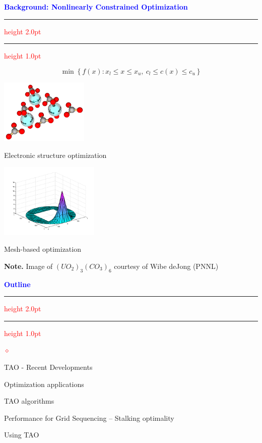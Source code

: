 \documentclass{seminar}
\newcommand{\reddiamond}{\textcolor{red}{$\diamond$}}
\newcommand{\redstripe}{\textcolor{red}{\hrule height 2.0pt\hfil}
             \vspace{-1.8pt}
             \textcolor{red}{\hrule height 1.0pt\hfil}
}
\newcommand{\heading}[1]{%
   \centerline{\textcolor{blue}{\textbf{#1}}}%
    \redstripe%
    \bigskip
}
\begin{document}
\begin{slide}

\heading{Background: Nonlinearly Constrained Optimization}

\[
\min \left \{ f(x): x_l \le x \le x_u , \ c_l \le c(x) \le c_u \right \}
\]

\vspace*{-1.0em}

\begin{minipage}[b]{.45\linewidth}
\ifpdf
\includegraphics[height=1.2in]{../images/molecule-uo23co36}
\small
\centerline{Electronic structure optimization}
\else
\fi
\end{minipage} 
\hfil
\begin{minipage}[b]{.45\linewidth}
\ifpdf
\includegraphics[height=1.4in]{../images/henon_circ_sol}
\small
\centerline{Mesh-based optimization}
\else
\fi
\end{minipage}

\bigskip
\small
\textbf{Note.} Image of $ (UO_2)_3 (CO_3)_6 $ courtesy of Wibe deJong (PNNL)

\vfill

\end{slide}

\begin{slide}

\heading{Outline}

\begin{list}{\reddiamond}{}
\item
TAO - Recent Developments
\item
Optimization applications
\item
TAO algorithms
\item
Performance for Grid Sequencing -- Stalking optimality
\item
Using TAO
\end{list}

\vfill

\end{slide}
\end{document}
